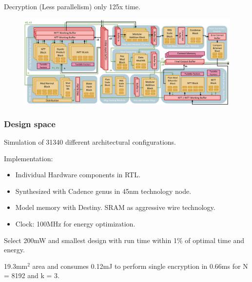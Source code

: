 \documentclass[10pt]{beamer}
\begin{document}
\begin{frame}
{    \vspace{-0.2cm}
    Decryption (Less parallelism) only 125x time.
    \begin{figure}
        \includegraphics[width=1.0\textwidth]{architecture4.png}
    \end{figure}
}


\end{frame}




\begin{frame}
\frametitle{Design space}
Simulation of 31340 different architectural configurations.

Implementation:
\pause
\begin{itemize}
    \item Individual Hardware components in RTL.
    \item Synthesized with Cadence genus in 45nm technology node.
\pause
    \item Model memory with Destiny. SRAM as aggressive wire technology.
    \item Clock: 100MHz for energy optimization.
\end{itemize}


\pause
Select 200mW and smallest design with run time within 1\% of optimal time and energy.

19.3mm$^2$ area and consumes 0.12mJ to perform single encryption in 0.66ms for N = 8192 and k = 3.
\end{frame}
\end{document}
